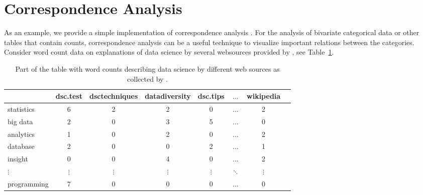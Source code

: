 \documentclass[article]{jdssv}
\begin{document}


\section{Correspondence Analysis} \label{sec:models}

As an example, we provide a simple implementation of correspondence analysis \citep[see, e.g.,][]{greenacre2010biplots}. For the analysis of bivariate categorical data or other tables that contain counts, correspondence analysis can be a useful technique to visualize important relations between the categories. Consider word count data on explanations of data science by several websources provided by \citet{Lubbe2018}, see Table~\ref{tab:word_counts}.

\begin{table}
\caption{Part of the table with word counts describing data science by different web sources as collected by \citet{Lubbe2018}.}
\label{tab:word_counts}
\begin{center}
\begin{tabular}{lccccccc} \hline
            & dsc.test & dsctechniques & datadiversity & dsc.tips & $\ldots$ & wikipedia \\ \hline
statistics  &       6  &           2   &          2    &    0     & $\ldots$ &  2 \\
big data    &       2  &           0   &          3    &    5     & $\ldots$ &  0 \\
analytics   &       1  &           0   &          2    &    0     & $\ldots$ &  2 \\
database    &       2  &           0   &          0    &    2     & $\ldots$ &  1 \\
insight     &       0  &           0   &          4    &    0     & $\ldots$ &  2 \\
$\vdots$    & $\vdots$ &    $\vdots$   &   $\vdots$    & $\vdots$ &$ \ddots$ & $\vdots$ \\
programming &       7  &           0   &          0    &    0     & $\ldots$ &  0 \\
\hline
\end{tabular}
\end{center}
\end{table}
\end{document}
